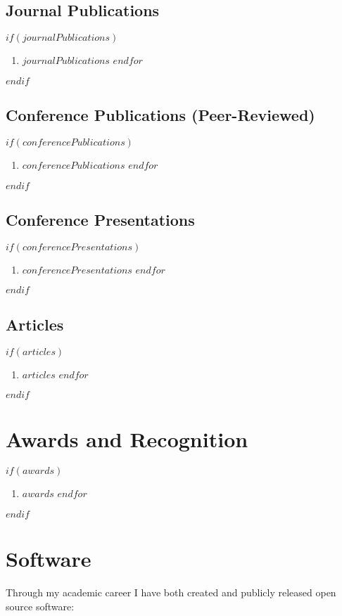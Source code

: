 \documentclass[$fontsize$, a4paper]{article}
\begin{document}
\subsection*{Journal Publications}
$if(journalPublications)$
\begin{enumerate}
$for(journalPublications)$
\item $journalPublications$
$endfor$
\end{enumerate}
$endif$

\subsection*{Conference Publications (Peer-Reviewed)}
$if(conferencePublications)$
\begin{enumerate}
$for(conferencePublications)$
\item $conferencePublications$
$endfor$
\end{enumerate}
$endif$

\subsection*{Conference Presentations}
$if(conferencePresentations)$
\begin{enumerate}
$for(conferencePresentations)$
\item $conferencePresentations$
$endfor$
\end{enumerate}
$endif$

\subsection*{Articles}
$if(articles)$
\begin{enumerate}
$for(articles)$
\item $articles$
$endfor$
\end{enumerate}
$endif$

\section*{Awards and Recognition}
$if(awards)$
\begin{enumerate}
$for(awards)$
\item $awards$
$endfor$
\end{enumerate}
$endif$

\section*{Software}
Through my academic career I have both created and publicly released open source software:
\end{document}
